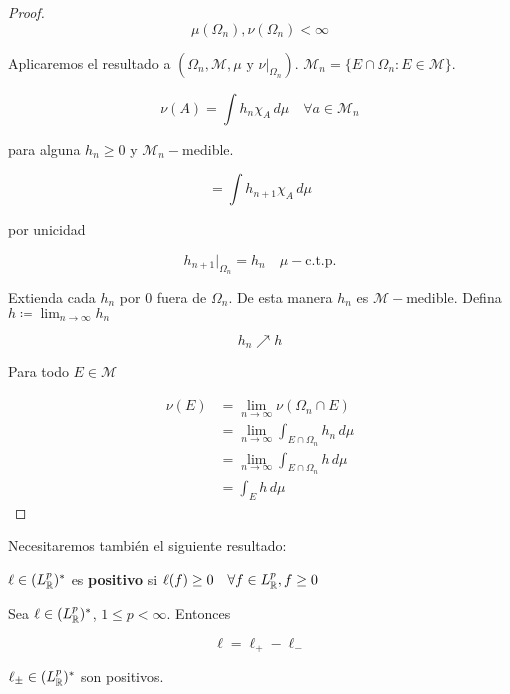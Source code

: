 \begin{proof}
    \[\mu(\Omega_n),\nu(\Omega_n)<\infty\]

    Aplicaremos el resultado a $(\Omega_n,\mathcal{M},\mu\text{ y }\nu|_{\Omega_n})$. $\mathcal{M}_n=\{E\cap \Omega_n:E\in\mathcal{M}\}$.

    \[\nu(A)=\int h_n\chi_A\,d\mu\quad\forall a\in \mathcal{M}_n\]

    para alguna $h_n\geq 0$ y $\mathcal{M}_n-$medible.

    \[=\int h_{n+1}\chi_A\,d\mu\]

    por unicidad 

    \[h_{n+1}|_{\Omega_n}=h_n\quad\mu-\text{c.t.p.}\]

    Extienda cada $h_n$ por $0$ fuera de $\Omega_n$. De esta manera $h_n$ es $\mathcal{M}-$medible. Defina $h\coloneqq \displaystyle\lim_{n\to\infty}h_n$

    \[h_n\nearrow h\]

    Para todo $E\in\mathcal{M}$

    \begin{align*}
        \nu(E)&=\lim_{n\to\infty} \nu(\Omega_n\cap E)\\
        &=\lim_{n\to\infty} \int_{E\cap\Omega_n} h_n\,d\mu\\
        &=\lim_{n\to\infty} \int_{E\cap \Omega_n} h\,d\mu\\
        &=\int_E h\,d\mu
    \end{align*}
\end{proof}

Necesitaremos también el siguiente resultado:

\begin{fdefinition}
    $\ell\in(L^p_{\mathbb{R}})^*$ es \textbf{positivo} si $\ell(f)\geq 0\quad\forall f\in L^p_{\mathbb{R}},f\geq 0$ 
\end{fdefinition}

\begin{ftheorem}
    Sea $\ell\in (L_{\mathbb{R}}^p)^*$, $1\leq p<\infty$. Entonces 

    \[\ell=\ell_+-\ell_-\]

    $\ell_{\pm}\in (L_{\mathbb{R}}^p)^*$ son positivos.
\end{ftheorem}

